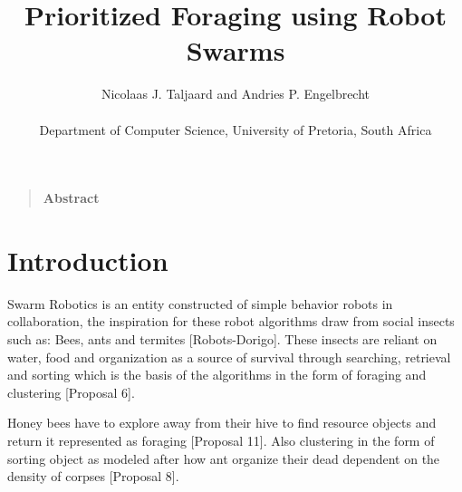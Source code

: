 \documentclass[12pt]{article}
\title{Prioritized Foraging using Robot Swarms}
\author
{Nicolaas J. Taljaard and Andries P. Engelbrecht\\
\\
\normalsize{Department of Computer Science, University of Pretoria, South Africa}\\
}
\date{}
\newenvironment{sciabstract}{%
\begin{quote} \bf}
{\end{quote}}
\begin{document}
 


\baselineskip24pt


\maketitle 




\begin{sciabstract}
  Abstract
\end{sciabstract}




\section{Introduction}

\par{Swarm Robotics is an entity constructed of simple behavior  robots in collaboration, the inspiration for these robot algorithms draw from social insects such as: Bees, ants and termites [Robots-Dorigo]. These insects are reliant on water, food and organization as a source of survival through searching, retrieval and sorting which is the basis of the algorithms in the form of foraging and clustering [Proposal 6].}
\\
\par{Honey bees have to explore away from their hive to find resource objects and return it represented as foraging [Proposal 11]. Also clustering in the form of sorting object as modeled after how ant organize their dead dependent on the density of corpses [Proposal 8].}
\end{document}
